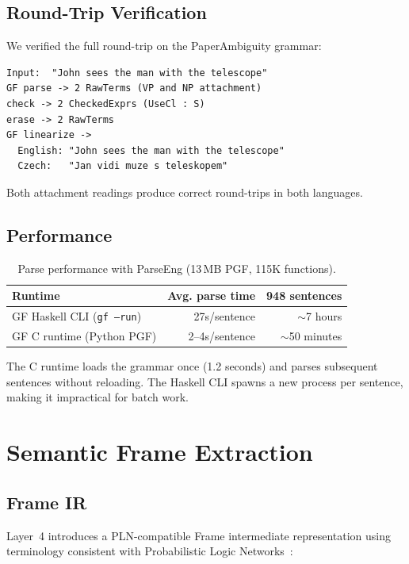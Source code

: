 \documentclass[]{article}
\newcommand{\code}[1]{\texttt{#1}}
\begin{document}
\subsection{Round-Trip Verification}

We verified the full round-trip on the PaperAmbiguity grammar:

\begin{lstlisting}
Input:  "John sees the man with the telescope"
GF parse -> 2 RawTerms (VP and NP attachment)
check -> 2 CheckedExprs (UseCl : S)
erase -> 2 RawTerms
GF linearize ->
  English: "John sees the man with the telescope"
  Czech:   "Jan vidi muze s teleskopem"
\end{lstlisting}

Both attachment readings produce correct round-trips in both languages.

\subsection{Performance}

\begin{table}[h]
\centering
\begin{tabular}{lrr}
\toprule
\textbf{Runtime} & \textbf{Avg. parse time} & \textbf{948 sentences} \\
\midrule
GF Haskell CLI (\code{gf --run}) & 27s/sentence & $\sim$7 hours \\
GF C runtime (Python PGF) & 2--4s/sentence & $\sim$50 minutes \\
\bottomrule
\end{tabular}
\caption{Parse performance with ParseEng (13\,MB PGF, 115K functions).}
\label{tab:performance}
\end{table}

The C runtime loads the grammar once (1.2 seconds) and parses
subsequent sentences without reloading. The Haskell CLI spawns a new
process per sentence, making it impractical for batch work.

\section{Semantic Frame Extraction}
\label{sec:frames}

\subsection{Frame IR}

Layer~4 introduces a PLN-compatible Frame intermediate representation
using terminology consistent with Probabilistic Logic Networks~\cite{goertzel2009pln}:
\end{document}
